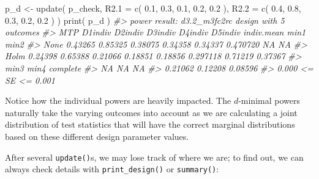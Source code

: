 \documentclass[
]{article}
\newenvironment{Shaded}{\begin{snugshade}}{\end{snugshade}}
\newcommand{\AttributeTok}[1]{\textcolor[rgb]{0.77,0.63,0.00}{#1}}
\newcommand{\CommentTok}[1]{\textcolor[rgb]{0.56,0.35,0.01}{\textit{#1}}}
\newcommand{\FloatTok}[1]{\textcolor[rgb]{0.00,0.00,0.81}{#1}}
\newcommand{\FunctionTok}[1]{\textcolor[rgb]{0.00,0.00,0.00}{#1}}
\newcommand{\NormalTok}[1]{#1}
\newcommand{\OtherTok}[1]{\textcolor[rgb]{0.56,0.35,0.01}{#1}}
\begin{document}
\begin{Shaded}
\begin{Highlighting}[]
\NormalTok{p\_d }\OtherTok{\textless{}{-}} \FunctionTok{update}\NormalTok{( p\_check,}
               \AttributeTok{R2.1 =} \FunctionTok{c}\NormalTok{( }\FloatTok{0.1}\NormalTok{, }\FloatTok{0.3}\NormalTok{, }\FloatTok{0.1}\NormalTok{, }\FloatTok{0.2}\NormalTok{, }\FloatTok{0.2}\NormalTok{ ),}
               \AttributeTok{R2.2 =} \FunctionTok{c}\NormalTok{( }\FloatTok{0.4}\NormalTok{, }\FloatTok{0.8}\NormalTok{, }\FloatTok{0.3}\NormalTok{, }\FloatTok{0.2}\NormalTok{, }\FloatTok{0.2}\NormalTok{ ) )}
\FunctionTok{print}\NormalTok{( p\_d )}
\CommentTok{\#\textgreater{} power result: d3.2\_m3fc2rc design with 5 outcomes}
\CommentTok{\#\textgreater{}   MTP D1indiv D2indiv D3indiv D4indiv D5indiv indiv.mean    min1    min2}
\CommentTok{\#\textgreater{}  None 0.43265 0.85325 0.38075 0.34358 0.34337   0.470720      NA      NA}
\CommentTok{\#\textgreater{}  Holm 0.24398 0.65388 0.21066 0.18851 0.18856   0.297118 0.71219 0.37367}
\CommentTok{\#\textgreater{}     min3    min4 complete}
\CommentTok{\#\textgreater{}       NA      NA       NA}
\CommentTok{\#\textgreater{}  0.21062 0.12208  0.08596}
\CommentTok{\#\textgreater{}  0.000 \textless{}= SE \textless{}= 0.001}
\end{Highlighting}
\end{Shaded}

Notice how the individual powers are heavily impacted. The \(d\)-minimal
powers naturally take the varying outcomes into account as we are
calculating a joint distribution of test statistics that will have the
correct marginal distributions based on these different design parameter
values.

After several \texttt{update()}s, we may lose track of where we are; to
find out, we can always check details with \texttt{print\_design()} or
\texttt{summary()}:
\end{document}

